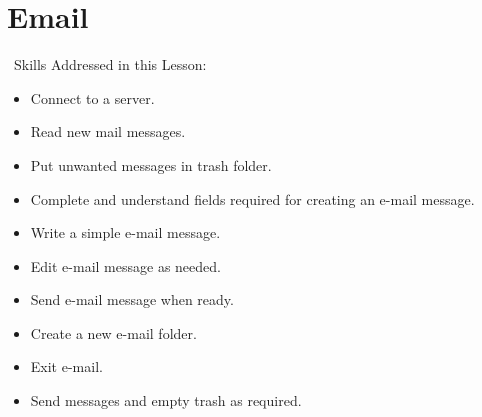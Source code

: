 \documentclass[10pt,letterpaper,twoside]{report}
\begin{document}
{{{\section{ Email}
\
Skills Addressed in this Lesson:
\begin{itemize}
	\item Connect to a server.
	\item Read new mail messages.
	\item Put unwanted messages in trash folder.
	\item Complete and understand fields required for creating an e-mail message.
	\item Write a simple e-mail message.
	\item Edit e-mail message as needed.
	\item Send e-mail message when ready.
	\item Create a new e-mail folder.
	\item Exit e-mail.
	\item Send messages and empty trash as required.
\end{itemize}
}}}
\end{document}
